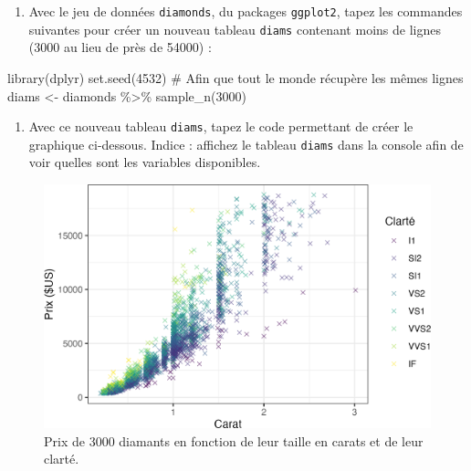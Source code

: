 \documentclass[
  letterpaper,
  DIV=11,
  numbers=noendperiod]{scrreprt}
\newenvironment{Shaded}{\begin{snugshade}}{\end{snugshade}}
\newcommand{\CommentTok}[1]{\textcolor[rgb]{0.37,0.37,0.37}{#1}}
\newcommand{\DecValTok}[1]{\textcolor[rgb]{0.68,0.00,0.00}{#1}}
\newcommand{\FunctionTok}[1]{\textcolor[rgb]{0.28,0.35,0.67}{#1}}
\newcommand{\NormalTok}[1]{\textcolor[rgb]{0.00,0.23,0.31}{#1}}
\newcommand{\OtherTok}[1]{\textcolor[rgb]{0.00,0.23,0.31}{#1}}
\newcommand{\SpecialCharTok}[1]{\textcolor[rgb]{0.37,0.37,0.37}{#1}}
\providecommand{\tightlist}{%
  \setlength{\itemsep}{0pt}\setlength{\parskip}{0pt}}\usepackage{longtable,booktabs,array}
\begin{document}
\begin{enumerate}
\def\labelenumi{\arabic{enumi}.}
\tightlist
\item
  Avec le jeu de données \texttt{diamonds}, du packages
  \texttt{ggplot2}, tapez les commandes suivantes pour créer un nouveau
  tableau \texttt{diams} contenant moins de lignes (3000 au lieu de près
  de 54000) :
\end{enumerate}

\begin{Shaded}
\begin{Highlighting}[]
\FunctionTok{library}\NormalTok{(dplyr)}
\FunctionTok{set.seed}\NormalTok{(}\DecValTok{4532}\NormalTok{) }\CommentTok{\# Afin que tout le monde récupère les mêmes lignes}
\NormalTok{diams }\OtherTok{\textless{}{-}}\NormalTok{ diamonds }\SpecialCharTok{\%\textgreater{}\%}
  \FunctionTok{sample\_n}\NormalTok{(}\DecValTok{3000}\NormalTok{)}
\end{Highlighting}
\end{Shaded}

\begin{enumerate}
\def\labelenumi{\arabic{enumi}.}
\setcounter{enumi}{1}
\tightlist
\item
  Avec ce nouveau tableau \texttt{diams}, tapez le code permettant de
  créer le graphique ci-dessous. Indice : affichez le tableau
  \texttt{diams} dans la console afin de voir quelles sont les variables
  disponibles.
\end{enumerate}

\begin{figure}

{\centering \includegraphics{./03-visualization_files/figure-pdf/unnamed-chunk-114-1.png}

}

\caption{Prix de 3000 diamants en fonction de leur taille en carats et
de leur clarté.}

\end{figure}
\end{document}
